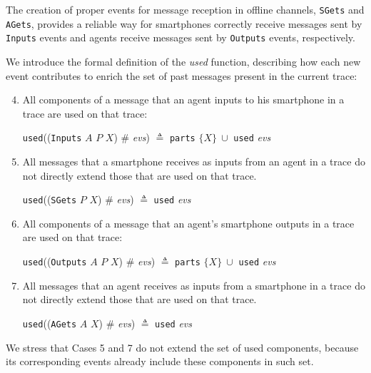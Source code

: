 The creation of proper events for message reception in offline channels, \texttt{SGets} and \texttt{AGets}, provides a reliable way for smartphones correctly receive messages sent by \texttt{Inputs} events and agents receive messages sent by \texttt{Outputs} events, respectively.

We introduce the formal definition of the \textit{used} function, describing how each new event contributes to enrich the set of past messages present in the current trace:

\begin{enumerate}
  \setcounter{enumi}{3}
  \item All components of a message that an agent inputs to his smartphone in a trace are used on that trace:
  \begin{center}
    \texttt{used}((\texttt{Inputs} $A$ $P$ $X$) $\#$ \textit{evs}) $\triangleq$ \texttt{parts} $\{ X\}\ \cup$ \texttt{used} \textit{evs}
  \end{center}

  \item All messages that a smartphone receives as inputs from an agent in a trace do not directly extend those that are used on that trace.
  \begin{center}
    \texttt{used}((\texttt{SGets} $P$ $X$) $\#$ \textit{evs}) $\triangleq$ \texttt{used} \textit{evs}
  \end{center}

  \item All components of a message that an agent's smartphone outputs in a trace are used on that trace:
  \begin{center}
    \texttt{used}((\texttt{Outputs} $A$ $P$ $X$) $\#$ \textit{evs}) $\triangleq$ \texttt{parts} $\{ X\}\ \cup$ \texttt{used} \textit{evs}
  \end{center}

  \item All messages that an agent receives as inputs from a smartphone in a trace do not directly extend those that are used on that trace.
  \begin{center}
    \texttt{used}((\texttt{AGets} $A$ $X$) $\#$ \textit{evs}) $\triangleq$ \texttt{used} \textit{evs}
  \end{center}
\end{enumerate}

\noindent We stress that Cases 5 and 7 do not extend the set of used components, because its corresponding events already include these components in such set.



